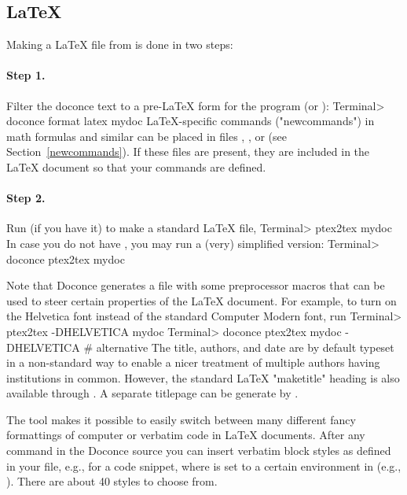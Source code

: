\documentclass{book}
\begin{document}
\subsection{{\LaTeX}}

Making a {\LaTeX} file  from  is done in two steps:

\paragraph{Step 1.}
Filter the doconce text to a pre-LaTeX form  for
the  program (or ):
\bsys
Terminal> doconce format latex mydoc
\esys
LaTeX-specific commands ("newcommands") in math formulas and similar
can be placed in files , , or
 (see Section~\ref{newcommands}).
If these files are present, they are included in the {\LaTeX} document
so that your commands are defined.

\paragraph{Step 2.}
Run  (if you have it) to make a standard {\LaTeX} file,
\bsys
Terminal> ptex2tex mydoc
\esys
In case you do not have , you may run a (very) simplified version:
\bsys
Terminal> doconce ptex2tex mydoc
\esys

Note that Doconce generates a  file with some preprocessor macros
that can be used to steer certain properties of the {\LaTeX} document.
For example, to turn on the Helvetica font instead of the standard
Computer Modern font, run
\bsys
Terminal> ptex2tex -DHELVETICA mydoc
Terminal> doconce ptex2tex mydoc -DHELVETICA  # alternative
\esys
The title, authors, and date are by default typeset in a non-standard
way to enable a nicer treatment of multiple authors having
institutions in common. However, the standard {\LaTeX} "maketitle" heading
is also available through .
A separate titlepage can be generate by
.

The  tool makes it possible to easily switch between many
different fancy formattings of computer or verbatim code in {\LaTeX}
documents. After any  command in the Doconce source you can
insert verbatim block styles as defined in your 
file, e.g.,  for a code snippet, where  is set to
a certain environment in  (e.g., ).
There are about 40 styles to choose from.
\end{document}
